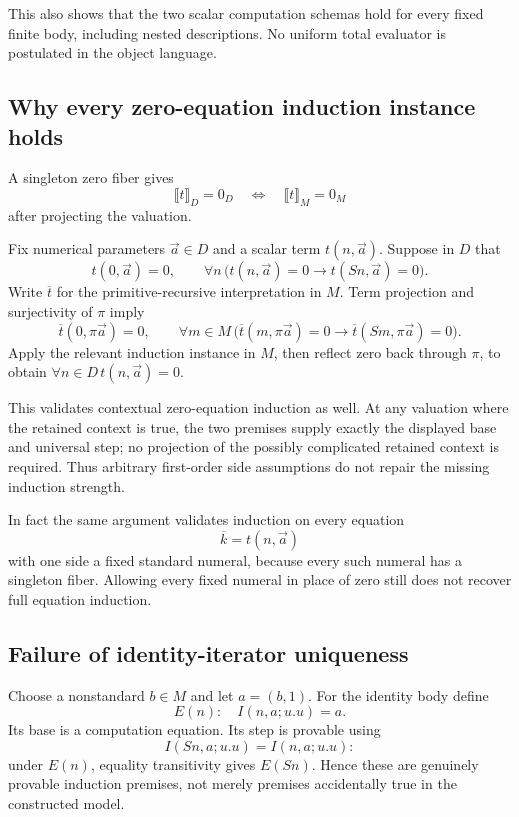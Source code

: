 This also shows that the two scalar computation schemas hold for every fixed finite body, including nested descriptions. No uniform total evaluator is postulated in the object language.

\subsection{Why every zero-equation induction instance holds}

A singleton zero fiber gives
\[
\llbracket t\rrbracket_D=0_D
\quad\Longleftrightarrow\quad
\llbracket t\rrbracket_M=0_M
\]
after projecting the valuation.

Fix numerical parameters \(\vec a\in D\) and a scalar term \(t(n,\vec a)\). Suppose in \(D\) that
\[
t(0,\vec a)=0,\qquad
\forall n\,\bigl(t(n,\vec a)=0\to t(Sn,\vec a)=0\bigr).
\]
Write \(\overline t\) for the primitive-recursive interpretation in \(M\).
Term projection and surjectivity of \(\pi\) imply
\[
\overline t(0,\pi\vec a)=0,\qquad
\forall m\in M\,
\bigl(\overline t(m,\pi\vec a)=0
      \to\overline t(Sm,\pi\vec a)=0\bigr).
\]
Apply the relevant induction instance in \(M\), then reflect zero back through \(\pi\), to obtain \(\forall n\in D\,t(n,\vec a)=0\).

This validates contextual zero-equation induction as well. At any valuation where the retained context is true, the two premises supply exactly the displayed base and universal step; no projection of the possibly complicated retained context is required. Thus arbitrary first-order side assumptions do not repair the missing induction strength.

In fact the same argument validates induction on every equation
\[
\overline{k}=t(n,\vec a)
\]
with one side a fixed standard numeral, because every such numeral has a singleton fiber. Allowing every fixed numeral in place of zero still does not recover full equation induction.

\subsection{Failure of identity-iterator uniqueness}

Choose a nonstandard \(b\in M\) and let \(a=(b,1)\). For the identity body define
\[
E(n):\quad I(n,a;u.u)=a.
\]
Its base is a computation equation. Its step is provable using
\[
I(Sn,a;u.u)=I(n,a;u.u):
\]
under \(E(n)\), equality transitivity gives \(E(Sn)\). Hence these are genuinely provable induction premises, not merely premises accidentally true in the constructed model.

